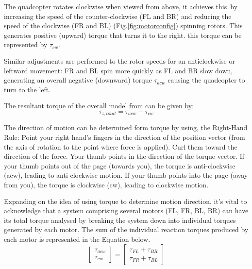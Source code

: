 \documentclass{article}
\begin{document}
The quadcopter rotates clockwise when viewed from above, it achieves this by increasing the speed of the counter-clockwise (FL and BR) and reducing the speed of the clockwise (FR and BL) (Fig.\ref{fig:motorconfig}) spinning rotors. This generates positive (upward) torque that turns it to the right.
this torque can be represented by \(\tau_{cw}\).

Similar adjustments are performed to the rotor speeds for an anticlockwise or leftward movement: FR and BL spin more quickly as FL and BR slow down, generating an overall negative (downward) torque \(\tau_{acw}\) causing the quadcopter to turn to the left.

The resultant torque of the overall model from can be given by:
\begin{equation}
  \tau_{z, total} = \tau_{acw} - \tau_{cw}
  \label{total_torque}
\end{equation}

The direction of motion can be determined form torque by using, the Right-Hand Rule: Point your right hand's fingers in the direction of the position vector (from the axis of rotation to the point where force is applied). Curl them toward the direction of the force. Your thumb points in the direction of the torque vector.
If your thumb points out of the page (towards you), the torque is anti-clockwise (acw), leading to anti-clockwise motion. If your thumb points into the page (away from you), the torque is clockwise (cw), leading to clockwise motion.

Expanding on the idea of using torque to determine motion direction, it's vital to acknowledge that a system comprising several motors (FL, FR, BL, BR)  can have its total torque analysed by breaking the system down into individual torques generated by each motor.
The sum of the individual reaction torques produced by each motor is represented in the Equation below. 
\begin{equation}
  \begin{bmatrix}
    \tau_{acw}\\
    \tau_{cw}
  \end{bmatrix} = 
  \begin{bmatrix}
    \tau_{FL} + \tau_{BR}\\
    \tau_{FR} + \tau_{BL}
  \end{bmatrix}
\end{equation}
\end{document}
